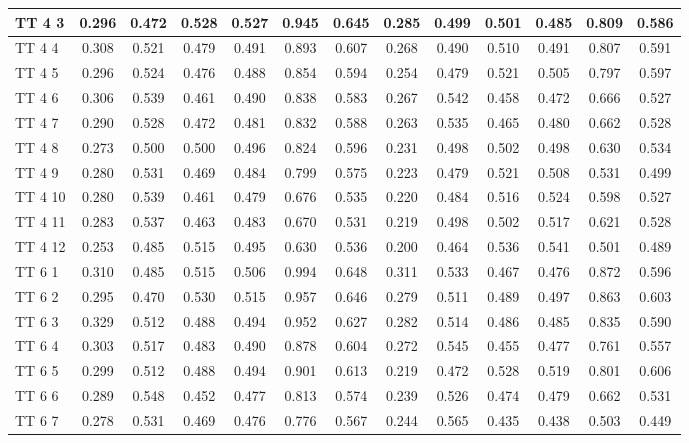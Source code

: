 \documentclass{article}
\begin{document}
\begin{tabular}{|l|c|c|c|c|c|c||c|c|c|c|c|c|}
TT  4  3 & 0.296 & 0.472 & 0.528 & 0.527 & 0.945 & 0.645 & 0.285 & 0.499 & 0.501 & 0.485 & 0.809 & 0.586\\ \hline
TT  4  4 & 0.308 & 0.521 & 0.479 & 0.491 & 0.893 & 0.607 & 0.268 & 0.490 & 0.510 & 0.491 & 0.807 & 0.591\\ \hline
TT  4  5 & 0.296 & 0.524 & 0.476 & 0.488 & 0.854 & 0.594 & 0.254 & 0.479 & 0.521 & 0.505 & 0.797 & 0.597\\ \hline
TT  4  6 & 0.306 & 0.539 & 0.461 & 0.490 & 0.838 & 0.583 & 0.267 & 0.542 & 0.458 & 0.472 & 0.666 & 0.527\\ \hline
TT  4  7 & 0.290 & 0.528 & 0.472 & 0.481 & 0.832 & 0.588 & 0.263 & 0.535 & 0.465 & 0.480 & 0.662 & 0.528\\ \hline
TT  4  8 & 0.273 & 0.500 & 0.500 & 0.496 & 0.824 & 0.596 & 0.231 & 0.498 & 0.502 & 0.498 & 0.630 & 0.534\\ \hline
TT  4  9 & 0.280 & 0.531 & 0.469 & 0.484 & 0.799 & 0.575 & 0.223 & 0.479 & 0.521 & 0.508 & 0.531 & 0.499\\ \hline
TT  4 10 & 0.280 & 0.539 & 0.461 & 0.479 & 0.676 & 0.535 & 0.220 & 0.484 & 0.516 & 0.524 & 0.598 & 0.527\\ \hline
TT  4 11 & 0.283 & 0.537 & 0.463 & 0.483 & 0.670 & 0.531 & 0.219 & 0.498 & 0.502 & 0.517 & 0.621 & 0.528\\ \hline
TT  4 12 & 0.253 & 0.485 & 0.515 & 0.495 & 0.630 & 0.536 & 0.200 & 0.464 & 0.536 & 0.541 & 0.501 & 0.489\\ \hline
TT  6  1 & 0.310 & 0.485 & 0.515 & 0.506 & 0.994 & 0.648 & 0.311 & 0.533 & 0.467 & 0.476 & 0.872 & 0.596\\ \hline
TT  6  2 & 0.295 & 0.470 & 0.530 & 0.515 & 0.957 & 0.646 & 0.279 & 0.511 & 0.489 & 0.497 & 0.863 & 0.603\\ \hline
TT  6  3 & 0.329 & 0.512 & 0.488 & 0.494 & 0.952 & 0.627 & 0.282 & 0.514 & 0.486 & 0.485 & 0.835 & 0.590\\ \hline
TT  6  4 & 0.303 & 0.517 & 0.483 & 0.490 & 0.878 & 0.604 & 0.272 & 0.545 & 0.455 & 0.477 & 0.761 & 0.557\\ \hline
TT  6  5 & 0.299 & 0.512 & 0.488 & 0.494 & 0.901 & 0.613 & 0.219 & 0.472 & 0.528 & 0.519 & 0.801 & 0.606\\ \hline
TT  6  6 & 0.289 & 0.548 & 0.452 & 0.477 & 0.813 & 0.574 & 0.239 & 0.526 & 0.474 & 0.479 & 0.662 & 0.531\\ \hline
TT  6  7 & 0.278 & 0.531 & 0.469 & 0.476 & 0.776 & 0.567 & 0.244 & 0.565 & 0.435 & 0.438 & 0.503 & 0.449\\ \hline

\end{tabular}
\end{document}
